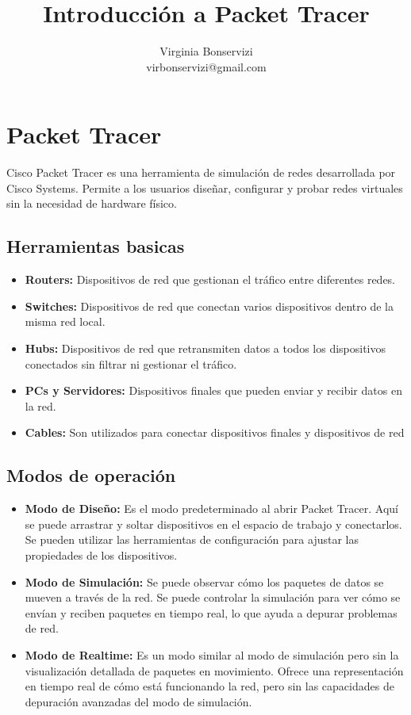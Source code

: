 \documentclass[11pt, a4paper]{article}
\title{Introducción a Packet Tracer}
\author{Virginia Bonservizi\\
        virbonservizi@gmail.com
}
\begin{document}
\maketitle


\section{Packet Tracer}
Cisco Packet Tracer es una herramienta de simulación de redes desarrollada por Cisco Systems. Permite a los usuarios diseñar, configurar y probar redes virtuales sin la necesidad de hardware físico.
\subsection{Herramientas basicas}

\begin{itemize}
    \item \textbf{Routers:} Dispositivos de red que gestionan el tráfico entre diferentes redes.
    \item \textbf{Switches:} Dispositivos de red que conectan varios dispositivos dentro de la misma red local.
    \item \textbf{Hubs:} Dispositivos de red que retransmiten datos a todos los dispositivos conectados sin filtrar ni gestionar el tráfico.
    \item \textbf{PCs y Servidores:} Dispositivos finales que pueden enviar y recibir datos en la red.
    \item \textbf{Cables:} Son utilizados para conectar dispositivos finales y dispositivos de red
\end{itemize}

\subsection{Modos de operación}

\begin{itemize}
    \item \textbf{Modo de Diseño:} Es el modo predeterminado al abrir Packet Tracer. Aquí se puede arrastrar y soltar dispositivos en el espacio de trabajo y conectarlos. Se pueden utilizar las herramientas de configuración para ajustar las propiedades de los dispositivos.
    \item \textbf{Modo de Simulación:} Se puede observar cómo los paquetes de datos se mueven a través de la red. Se puede controlar la simulación para ver cómo se envían y reciben paquetes en tiempo real, lo que ayuda a depurar problemas de red.
    \item \textbf{Modo de Realtime:} Es un modo similar al modo de simulación pero sin la visualización detallada de paquetes en movimiento. Ofrece una representación en tiempo real de cómo está funcionando la red, pero sin las capacidades de depuración avanzadas del modo de simulación.

\end{itemize}
\end{document}
